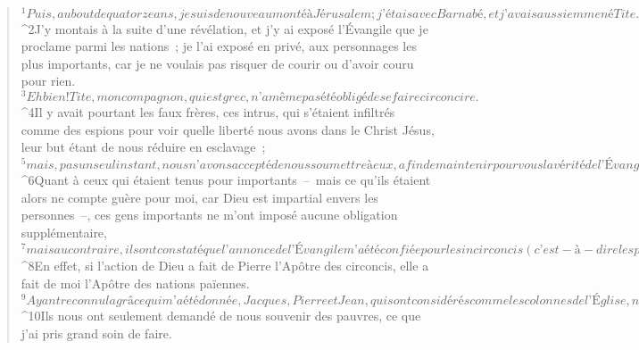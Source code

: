          
      \bchapter{}
      \begin{verse}
${}^{1}Puis, au bout de quatorze ans, je suis de nouveau monté à Jérusalem ; j’étais avec Barnabé, et j’avais aussi emmené Tite. 
${}^{2}J’y montais à la suite d’une révélation, et j’y ai exposé l’Évangile que je proclame parmi les nations ; je l’ai exposé en privé, aux personnages les plus importants, car je ne voulais pas risquer de courir ou d’avoir couru pour rien. 
${}^{3}Eh bien ! Tite, mon compagnon, qui est grec, n’a même pas été obligé de se faire circoncire. 
${}^{4}Il y avait pourtant les faux frères, ces intrus, qui s’étaient infiltrés comme des espions pour voir quelle liberté nous avons dans le Christ Jésus, leur but étant de nous réduire en esclavage ; 
${}^{5}mais, pas un seul instant, nous n’avons accepté de nous soumettre à eux, afin de maintenir pour vous la vérité de l’Évangile. 
${}^{6}Quant à ceux qui étaient tenus pour importants – mais ce qu’ils étaient alors ne compte guère pour moi, car Dieu est impartial envers les personnes –, ces gens importants ne m’ont imposé aucune obligation supplémentaire, 
${}^{7}mais au contraire, ils ont constaté que l’annonce de l’Évangile m’a été confiée pour les incirconcis (c’est-à-dire les païens), comme elle l’a été à Pierre pour les circoncis (c’est-à-dire les Juifs). 
${}^{8}En effet, si l’action de Dieu a fait de Pierre l’Apôtre des circoncis, elle a fait de moi l’Apôtre des nations païennes. 
${}^{9}Ayant reconnu la grâce qui m’a été donnée, Jacques, Pierre et Jean, qui sont considérés comme les colonnes de l’Église, nous ont tendu la main, à moi et à Barnabé, en signe de communion, montrant par là que nous sommes, nous, envoyés aux nations, et eux, aux circoncis. 
${}^{10}Ils nous ont seulement demandé de nous souvenir des pauvres, ce que j’ai pris grand soin de faire.
      

\end{verse}
